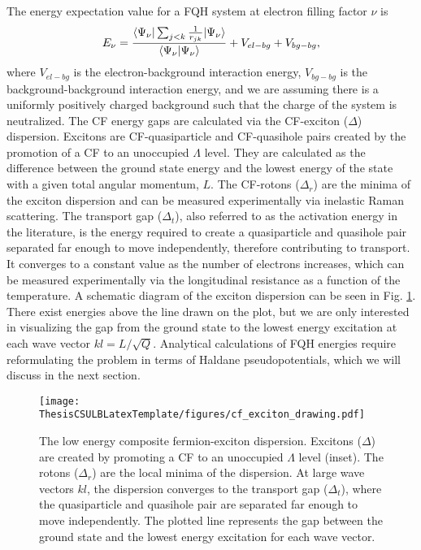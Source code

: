     The energy expectation value for a FQH system at electron filling factor $\nu$ is 
    \begin{equation} \label{compFermEigEn}
    E_\nu=\frac{\braket{\Psi_\nu|\sum_{j<k}\frac{1}{r_{jk}}|\Psi_\nu}}{\braket{\Psi_\nu|\Psi_\nu}}+V_{el-bg}+V_{bg-bg}, 
    \end{equation}
	where $V_{el-bg}$ is the electron-background interaction energy, $V_{bg-bg}$ is the background-background interaction energy, and we are assuming there is a uniformly positively charged background such that the charge of the system is neutralized. The CF energy gaps are calculated via the CF-exciton ($\Delta$) dispersion. Excitons are CF-quasiparticle and CF-quasihole pairs created by the promotion of a CF to an unoccupied $\Lambda$ level. They are calculated as the difference between the ground state energy and the lowest energy of the state with a given total angular momentum, $L$. The CF-rotons ($\Delta_r$) are the minima of the exciton dispersion and can be measured experimentally via inelastic Raman scattering. The transport gap ($\Delta_t$), also referred to as the activation energy in the literature, is the energy required to create a quasiparticle and quasihole pair separated far enough to move independently, therefore contributing to transport. It converges to a constant value as the number of electrons increases, which can be measured experimentally via the longitudinal resistance as a function of the temperature. A schematic diagram of the exciton dispersion can be seen in Fig. \ref{transpGapDisp}. There exist energies above the line drawn on the plot, but we are only interested in visualizing the gap from the ground state to the lowest energy excitation at each wave vector $kl=L/\sqrt{Q}$. Analytical calculations of FQH energies require reformulating the problem in terms of Haldane pseudopotentials, which we will discuss in the next section.

    \begin{figure}[h]
    \begin{center}
    \texttt{[image: ThesisCSULBLatexTemplate/figures/cf\_exciton\_drawing.pdf]}
    \caption[The low energy composite fermion-exciton dispersion.]{The low energy composite fermion-exciton dispersion. Excitons ($\Delta$) are created by promoting a CF to an unoccupied $\Lambda$ level (inset). The rotons ($\Delta_r$) are the local minima of the dispersion. At large wave vectors $kl$, the dispersion converges to the transport gap ($\Delta_t$), where the quasiparticle and quasihole pair are separated far enough to move independently. The plotted line represents the gap between the ground state and the lowest energy excitation for each wave vector.}
    \label{transpGapDisp}
    \end{center}
    \end{figure}

